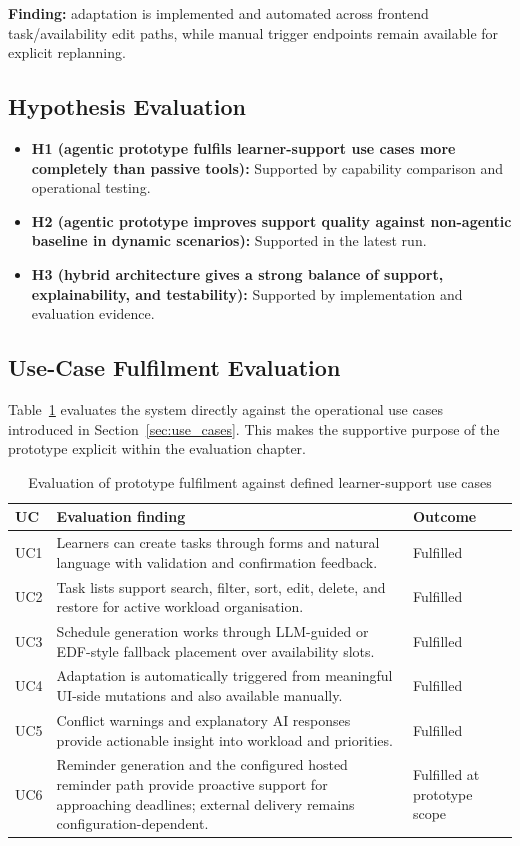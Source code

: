 \documentclass[12pt]{article}
\begin{document}
\textbf{Finding:} adaptation is implemented and automated across frontend task/availability edit paths, while manual trigger endpoints remain available for explicit replanning.

\subsection{Hypothesis Evaluation}

\begin{itemize}
    \item \textbf{H1 (agentic prototype fulfils learner-support use cases more completely than passive tools):} Supported by capability comparison and operational testing.
    \item \textbf{H2 (agentic prototype improves support quality against non-agentic baseline in dynamic scenarios):} Supported in the latest run.
    \item \textbf{H3 (hybrid architecture gives a strong balance of support, explainability, and testability):} Supported by implementation and evaluation evidence.
\end{itemize}

\subsection{Use-Case Fulfilment Evaluation}
Table~\ref{tab:use_case_eval} evaluates the system directly against the operational use cases introduced in Section~\ref{sec:use_cases}. This makes the supportive purpose of the prototype explicit within the evaluation chapter.

\begin{table}[h!]
\centering
\scriptsize
\begin{tabular}{|p{1.2cm}|p{5.0cm}|p{3.6cm}|}
\hline
\textbf{UC} & \textbf{Evaluation finding} & \textbf{Outcome} \\
\hline
UC1 & Learners can create tasks through forms and natural language with validation and confirmation feedback. & Fulfilled \\
\hline
UC2 & Task lists support search, filter, sort, edit, delete, and restore for active workload organisation. & Fulfilled \\
\hline
UC3 & Schedule generation works through LLM-guided or EDF-style fallback placement over availability slots. & Fulfilled \\
\hline
UC4 & Adaptation is automatically triggered from meaningful UI-side mutations and also available manually. & Fulfilled \\
\hline
UC5 & Conflict warnings and explanatory AI responses provide actionable insight into workload and priorities. & Fulfilled \\
\hline
UC6 & Reminder generation and the configured hosted reminder path provide proactive support for approaching deadlines; external delivery remains configuration-dependent. & Fulfilled at prototype scope \\
\hline
\end{tabular}
\caption{Evaluation of prototype fulfilment against defined learner-support use cases}
\label{tab:use_case_eval}
\end{table}
\end{document}
